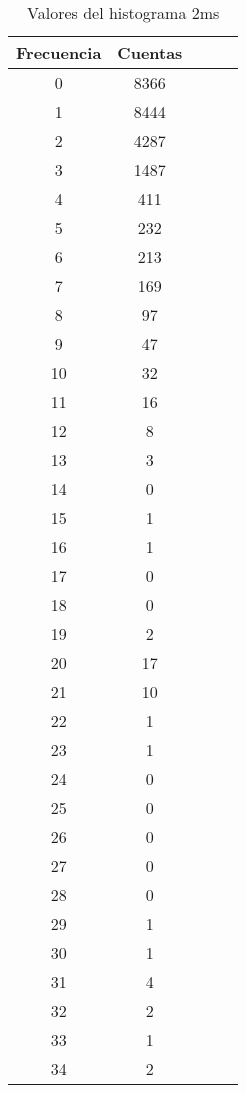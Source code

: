 \begin{center}
\begin{table}[H]
\caption{Valores del histograma 2ms}
\label{Tab:histo_2s}
\begin{tabular}{ccccc}
\toprule
Frecuencia & Cuentas \\
\midrule
\num{    0} & \num{ 8366} \\
\num{    1} & \num{ 8444} \\
\num{    2} & \num{ 4287} \\
\num{    3} & \num{ 1487} \\
\num{    4} & \num{  411} \\
\num{    5} & \num{  232} \\
\num{    6} & \num{  213} \\
\num{    7} & \num{  169} \\
\num{    8} & \num{   97} \\
\num{    9} & \num{   47} \\
\num{   10} & \num{   32} \\
\num{   11} & \num{   16} \\
\num{   12} & \num{    8} \\
\num{   13} & \num{    3} \\
\num{   14} & \num{    0} \\
\num{   15} & \num{    1} \\
\num{   16} & \num{    1} \\
\num{   17} & \num{    0} \\
\num{   18} & \num{    0} \\
\num{   19} & \num{    2} \\
\num{   20} & \num{   17} \\
\num{   21} & \num{   10} \\
\num{   22} & \num{    1} \\
\num{   23} & \num{    1} \\
\num{   24} & \num{    0} \\
\num{   25} & \num{    0} \\
\num{   26} & \num{    0} \\
\num{   27} & \num{    0} \\
\num{   28} & \num{    0} \\
\num{   29} & \num{    1} \\
\num{   30} & \num{    1} \\
\num{   31} & \num{    4} \\
\num{   32} & \num{    2} \\
\num{   33} & \num{    1} \\
\num{   34} & \num{    2} \\
\bottomrule
\end{tabular}
\end{table}
\end{center}
